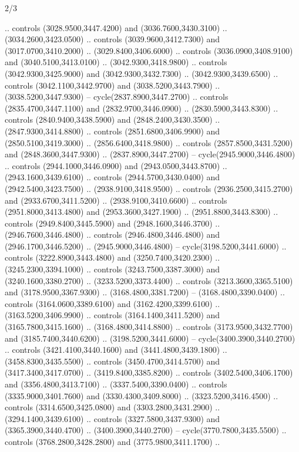 \begin{flagdescription}{2/3}
\begin{scope}[shift={(0.5\flaglength,0.5)},scale=\flagwidth/130]
\begin{scope}[y=0.01mm, x=0.01mm,shift={(-3365,-2250)}]
  .. controls (3028.9500,3447.4200) and (3036.7600,3430.3100) ..
  (3034.2600,3423.0500) .. controls (3039.9600,3412.7300) and
  (3017.0700,3410.2000) .. (3029.8400,3406.6000) .. controls
  (3036.0900,3408.9100) and (3040.5100,3413.0100) .. (3042.9300,3418.9800) ..
  controls (3042.9300,3425.9000) and (3042.9300,3432.7300) ..
  (3042.9300,3439.6500) .. controls (3042.1100,3442.9700) and
  (3038.5200,3443.7900) .. (3038.5200,3447.9300) -- cycle(2837.8900,3447.2700)
  .. controls (2835.4700,3447.1100) and (2832.9700,3446.0900) ..
  (2830.5900,3443.8300) .. controls (2840.9400,3438.5900) and
  (2848.2400,3430.3500) .. (2847.9300,3414.8800) .. controls
  (2851.6800,3406.9900) and (2850.5100,3419.3000) .. (2856.6400,3418.9800) ..
  controls (2857.8500,3431.5200) and (2848.3600,3447.9300) ..
  (2837.8900,3447.2700) -- cycle(2945.9000,3446.4800) .. controls
  (2944.1000,3446.0900) and (2943.0500,3443.8700) .. (2943.1600,3439.6100) ..
  controls (2944.5700,3430.0400) and (2942.5400,3423.7500) ..
  (2938.9100,3418.9500) .. controls (2936.2500,3415.2700) and
  (2933.6700,3411.5200) .. (2938.9100,3410.6600) .. controls
  (2951.8000,3413.4800) and (2953.3600,3427.1900) .. (2951.8800,3443.8300) ..
  controls (2949.8400,3445.5900) and (2948.1600,3446.3700) ..
  (2946.7600,3446.4800) .. controls (2946.4800,3446.4800) and
  (2946.1700,3446.5200) .. (2945.9000,3446.4800) -- cycle(3198.5200,3441.6000)
  .. controls (3222.8900,3443.4800) and (3250.7400,3420.2300) ..
  (3245.2300,3394.1000) .. controls (3243.7500,3387.3000) and
  (3240.1600,3380.2700) .. (3233.5200,3373.4400) .. controls
  (3213.3600,3365.5100) and (3178.9500,3367.9300) .. (3168.4800,3381.7200) --
  (3168.4800,3390.0400) .. controls (3164.0600,3389.6100) and
  (3162.4200,3399.6100) .. (3163.5200,3406.9900) .. controls
  (3164.1400,3411.5200) and (3165.7800,3415.1600) .. (3168.4800,3414.8800) ..
  controls (3173.9500,3432.7700) and (3185.7400,3440.6200) ..
  (3198.5200,3441.6000) -- cycle(3400.3900,3440.2700) .. controls
  (3421.4100,3440.1600) and (3441.4800,3439.1800) .. (3458.8300,3435.5500) ..
  controls (3450.4700,3414.5700) and (3417.3400,3417.0700) ..
  (3419.8400,3385.8200) .. controls (3402.5400,3406.1700) and
  (3356.4800,3413.7100) .. (3337.5400,3390.0400) .. controls
  (3335.9000,3401.7600) and (3330.4300,3409.8000) .. (3323.5200,3416.4500) ..
  controls (3314.6500,3425.0800) and (3303.2800,3431.2900) ..
  (3294.1400,3439.6100) .. controls (3327.5800,3437.9300) and
  (3365.3900,3440.4700) .. (3400.3900,3440.2700) -- cycle(3770.7800,3435.5500)
  .. controls (3768.2800,3428.2800) and (3775.9800,3411.1700) ..

\end{scope}
\end{scope}
\end{flagdescription}
